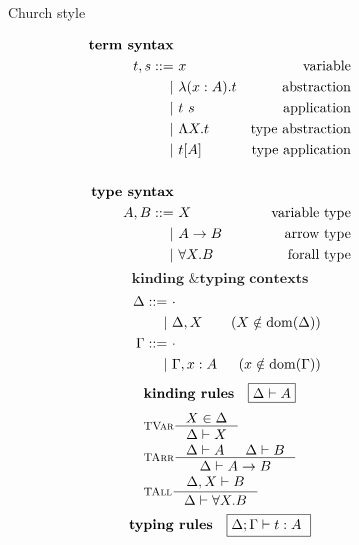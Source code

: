 \begin{figure}
\begin{singlespace}
\hspace{-2.5em}\begin{minipage}{.46\textwidth}
        \begin{center}Church style\end{center}
\def\baselinestretch{0}
\small
\begin{align*}
\textbf{term syntax} \\
t,s ::= &~ x           & \text{variable}    \\
      | &~ \lambda(x:A) . t & \text{abstraction} \\
      | &~ t ~ s       & \text{application} \\
      | &~ \Lambda X    . t & \text{type abstraction} \\
      | &~ t [A]       & \text{type application} \\
\\
\textbf{type syntax} \\
A,B ::= &~ X           & \text{variable type}   \\
      | &~ A -> B      & \text{arrow type} \\
      | &~ \forall X.B & \text{forall type}   \\
\end{align*}
\[ \textbf{kinding \& typing contexts} \]\vspace*{-1em}
\begin{align*}\quad
\Delta ::= &~ \cdot \\
         | &~ \Delta, X & (X\notin \mathop{\mathrm{dom}}(\Delta)) \\
\Gamma ::= &~ \cdot \\
         | &~ \Gamma, x:A & (x\notin \mathop{\mathrm{dom}}(\Gamma)) \\
\end{align*}
\[ \textbf{kinding rules} \quad \framebox{$ \Delta |- A $} \]\vspace*{-1em}
\begin{align*}
& \inference[\sc TVar]{X \in \Delta}{\Delta |- X} \\
& \inference[\sc TArr]{\Delta |- A & \Delta |- B}{\Delta |- A -> B} \\
& \inference[\sc TAll]{\Delta,X |- B}{\Delta |- \forall X.B} \\
\end{align*}
\[ \textbf{typing rules} \quad \framebox{$ \Delta;\Gamma |- t : A $ } \]
\vspace*{-1em}
\begin{align*}

\end{align*}
\end{minipage}
\end{singlespace}
\end{figure}
